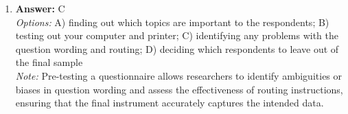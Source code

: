 \documentclass[12pt]{article}
\begin{document}
\begin{enumerate}[label=\arabic*.]
\\ \textit{Note:} The correct answer "all of the above" is supported by the key concept that terrorism is characterized by its political motives, intended to create fear and influence societal change, which fundamentally distinguishes it from the individualistic and socio-economic crime types emphasized by the Chicago School.
\item \textbf{Answer:} C
\\ \textit{Options:} A) finding out which topics are important to the respondents; B) testing out your computer and printer; C) identifying any problems with the question wording and routing; D) deciding which respondents to leave out of the final sample
\\ \textit{Note:} Pre-testing a questionnaire allows researchers to identify ambiguities or biases in question wording and assess the effectiveness of routing instructions, ensuring that the final instrument accurately captures the intended data.
\end{enumerate}
\end{document}
